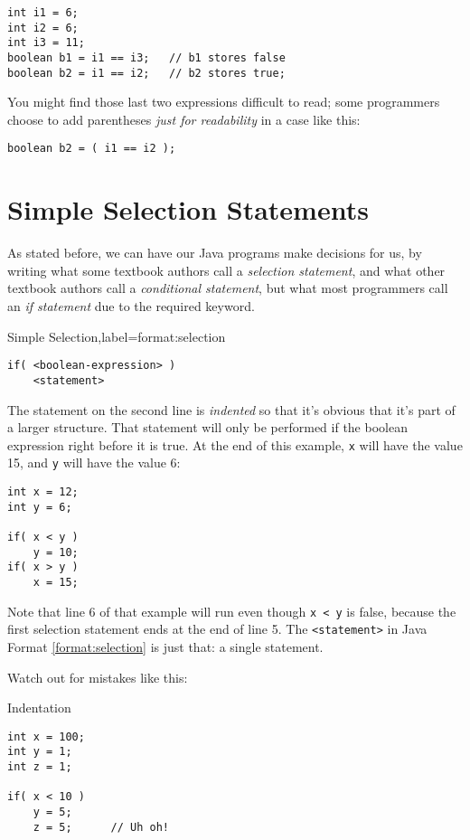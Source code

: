 \begin{verbatim}
int i1 = 6;
int i2 = 6;
int i3 = 11;
boolean b1 = i1 == i3;   // b1 stores false
boolean b2 = i1 == i2;   // b2 stores true;
\end{verbatim}

You might find those last two expressions difficult to read; some programmers choose to add parentheses \textit{just for readability} in a case like this:

\begin{verbatim}
boolean b2 = ( i1 == i2 );
\end{verbatim}

\section{Simple Selection Statements}
\label{section:simple-selection}
As stated before, we can have our Java programs make decisions for us, by writing what some textbook authors call a \textit{selection statement}, and what other textbook authors call a \textit{conditional statement}, but what most programmers call an \textit{if statement} due to the required keyword.

\begin{javaformat}{Simple Selection,label=format:selection}
\begin{verbatim}
if( <boolean-expression> )
    <statement>
\end{verbatim}
\end{javaformat}

The statement on the second line is \textit{indented} so that it's obvious that it's part of a larger structure.  That statement will only be performed if the boolean expression right before it is true.  At the end of this example, \texttt{x} will have the value 15, and \texttt{y} will have the value 6:

\begin{verbatim}
int x = 12;
int y = 6;

if( x < y )
    y = 10;
if( x > y )
    x = 15;
\end{verbatim}

Note that line 6 of that example will run even though \texttt{x < y} is false, because the first selection statement ends at the end of line 5.  The \texttt{<statement>} in Java Format \ref{format:selection} is just that: a single statement.

Watch out for mistakes like this:
\begin{trap}{Indentation}\label{trap:selection}
\begin{verbatim}
int x = 100;
int y = 1;
int z = 1;

if( x < 10 )
    y = 5;
    z = 5;      // Uh oh!
\end{verbatim}
\end{trap}

